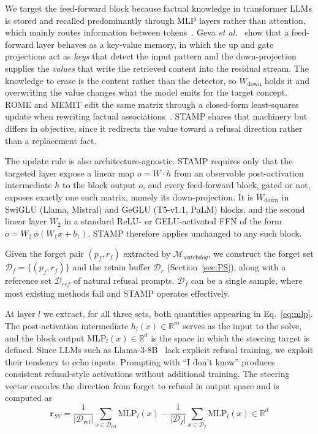We target the feed-forward block because factual knowledge in transformer LLMs is stored and recalled predominantly through MLP layers rather than attention, which mainly routes information between tokens~\cite{geva2021transformer}. Geva \textit{et al.}~\cite{geva2021transformer} show that a feed-forward layer behaves as a key-value memory, in which the up and gate projections act as \textit{keys} that detect the input pattern and the down-projection supplies the \textit{values} that write the retrieved content into the residual stream. The knowledge to erase is the content rather than the detector, so $W_{\mathrm{down}}$ holds it and overwriting the value changes what the model emits for the target concept. ROME and MEMIT edit the same matrix through a closed-form least-squares update when rewriting factual associations~\cite{meng2022locating, meng2022mass}. STAMP shares that machinery but differs in objective, since it redirects the value toward a refusal direction rather than a replacement fact.

The update rule is also architecture-agnostic. STAMP requires only that the targeted layer expose a linear map $o = W \cdot h$ from an observable post-activation intermediate $h$ to the block output $o$, and every feed-forward block, gated or not, exposes exactly one such matrix, namely its down-projection. It is $W_{\mathrm{down}}$ in SwiGLU (Llama, Mistral) and GeGLU (T5-v1.1, PaLM) blocks, and the second linear layer $W_2$ in a standard ReLU- or GELU-activated FFN of the form $o = W_2\,\phi(W_1 x + b_1)$. STAMP therefore applies unchanged to any such block.

Given the forget pair $(p_f, r_f)$ extracted by $\mathcal{M}_{\textit{watchdog}}$, we construct the forget set $\mathcal{D}_f = \{(p_f, r_f)\}$ and the retain buffer $\mathcal{D}_r$ (Section~\ref{sec:PS}), along with a reference set $\mathcal{D}_{\textit{ref}}$ of natural refusal prompts. $\mathcal{D}_f$ can be a single sample, where most existing methods fail and STAMP operates effectively.

At layer $l$ we extract, for all three sets, both quantities appearing in Eq.~\eqref{eq:mlp}. The post-activation intermediate $h_l(x) \in \mathbb{R}^{m}$ serves as the input to the solve, and the block output $\mathrm{MLP}_l(x) \in \mathbb{R}^{d}$ is the space in which the steering target is defined. Since LLMs such as Llama-3-8B~\cite{grattafiori2024llama} lack explicit refusal training, we exploit their tendency to echo inputs. Prompting with ``I don't know'' produces consistent refusal-style activations without additional training. The steering vector encodes the direction from forget to refusal in output space and is computed as
\begin{equation}
\mathbf{r}_{\mathrm{\textit{SV}}} = \frac{1}{|\mathcal{D}_{\mathrm{ref}}|} \sum_{x \in \mathcal{D}_{\mathrm{ref}}} \mathrm{MLP}_l(x) - \frac{1}{|\mathcal{D}_f|} \sum_{x \in \mathcal{D}_f} \mathrm{MLP}_l(x) \in \mathbb{R}^{d}
\label{eq:steering_vector}
\end{equation}

